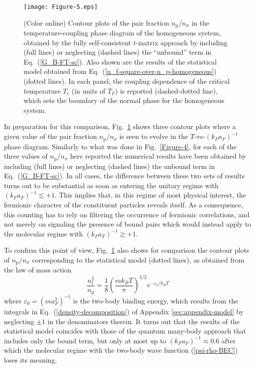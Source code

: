 \documentclass[pra,twocolumn,aps,amssymb,showpacs,superscriptaddress]{revtex4-1}
\begin{document}
\begin{figure}[t]
\begin{center}
\texttt{[image: Figure-5.eps]}
\caption{(Color online) Contour plots of the pair fraction $n_{\mathrm{p}}/n_{\sigma}$ in the temperature-coupling phase diagram of the homogeneous system, obtained by the fully self-consistent 
                                    $t$-matrix approach by including (full lines) or neglecting (dashed lines) the ``unbound'' term in Eq.~(\ref{G_B-FT-sc}).
                                    Also shown are the results of the statistical model obtained from Eq.~(\ref{n_f-square-over-n_p-homogeneous}) (dotted lines).
                                    In each panel, the coupling dependence of the critical temperature $T_{c}$ (in units of $T_{F}$) is reported (dashed-dotted line), which sets the boundary of the normal phase 
                                    for the homogeneous system.}
\label{Figure-5}
\end{center} 
\end{figure} 


In preparation for this comparison, Fig.~\ref{Figure-5} shows three contour plots where a given value of the pair fraction $n_{\mathrm{p}}/n_{\sigma}$ is seen to evolve in 
the $T$-vs-$(k_{F} a_{F})^{-1}$ phase diagram.
Similarly to what was done in Fig.~\ref{Figure-4}, for each of the three values of $n_{\mathrm{p}}/n_{\sigma}$ here reported the numerical results have been obtained by including (full lines) or neglecting (dashed lines) the unbound term in Eq.~(\ref{G_B-FT-sc}).
In all cases, the difference between these two sets of results turns out to be substantial as soon as entering the unitary regime with $(k_{F} a_{F})^{-1} \lesssim +1$. 
This implies that, in this regime of most physical interest, the fermionic character of the constituent particles reveals itself.
As a consequence, this counting has to rely on filtering the occurrence of fermionic correlations, and not merely on signaling the presence of bound pairs which would instead apply to the molecular regime with $(k_{F} a_{F})^{-1} \gtrsim+1$.
 
To confirm this point of view, Fig.~\ref{Figure-5} also shows for comparison the contour plots of $n_{\mathrm{p}}/n_{\sigma}$ corresponding to the statistical model (dotted lines), as obtained from the law of mass action 
\begin{equation}
\frac{n_{\mathrm{f}}^{2}}{n_{\mathrm{p}}} = \frac{1}{8} \left( \frac{m k_{B} T}{\pi} \right)^{3/2} \!\! e^{-\varepsilon_{0}/k_{B}T} 
\label{n_f-square-over-n_p-homogeneous}
\end{equation}
where $\varepsilon_{0} = (m a_{F}^{2})^{-1}$ is the two-body binding energy, which results from the integrals in Eq.~(\ref{density-decomposition}) of Appendix \ref{sec:appendix-model} 
by neglecting $\pm 1$ in the denominators therein.
It turns out that the results of the statistical model coincides with those of the quantum many-body approach that includes only the bound term, but only at most up to $(k_{F} a_{F})^{-1} \approx 0.6$ after which the molecular regime with the two-body wave function (\ref{psi-rho-BEC}) loses its meaning.
\end{document}
